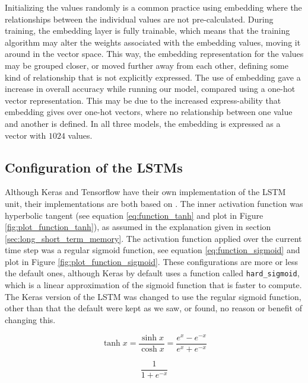 Initializing the values randomly is a common practice using embedding where the relationships between the individual values are not pre-calculated. During training, the embedding layer is fully trainable, which means that the training algorithm may alter the weights associated with the embedding values, moving it around in the vector space. This way, the embedding representation for the values may be grouped closer, or moved further away from each other, defining some kind of relationship that is not explicitly expressed. The use of embedding gave a increase in overall accuracy while running our model, compared using a one-hot vector representation. This may be due to the increased express-ability that embedding gives over one-hot vectors, where no relationship between one value and another is defined. In all three models, the embedding is expressed as a vector with \(1024\) values.

\subsection{Configuration of the LSTMs}
Although Keras and Tensorflow have their own implementation of the LSTM unit, their implementations are both based on \citep{hochreiter1997long}. The inner activation function was hyperbolic tangent (see equation \ref{eq:function_tanh} and plot in Figure \ref{fig:plot_function_tanh}), as assumed in the explanation given in section \ref{sec:long_short_term_memory}. The activation function applied over the current time step was a regular sigmoid function, see equation \ref{eq:function_sigmoid} and plot in Figure \ref{fig:plot_function_sigmoid}. These configurations are more or less the default ones, although Keras by default uses a function called {\tt hard\_sigmoid}, which is a linear approximation of the sigmoid function that is faster to compute. The Keras version of the LSTM was changed to use the regular sigmoid function, other than that the default were kept as we saw, or found, no reason or benefit of changing this.

\begin{figure}[ht]
    \centering
    \begin{minipage}{.5\textwidth}
        \centering
        \captionsetup{justification=centering}
        \begin{equation}\label{eq:function_tanh}
            \tanh{x} = \frac{\sinh{x}}{\cosh{x}} = \frac{e^{x}-e^{-x}}{e^{x}+e^{-x}}
        \end{equation}
    \end{minipage}%
    \begin{minipage}{.5\textwidth}
        \centering
        \captionsetup{justification=centering}
        \begin{equation}\label{eq:function_sigmoid}
            \frac{1}{1+e^{-x}}
        \end{equation}
    \end{minipage}%
\end{figure}

